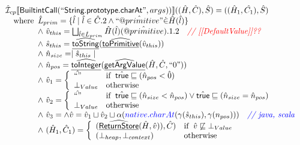 \documentclass{article}
\makeatletter
\newcommand{\SF}[1]{\mbox{\textsf{#1}}}
\newcommand{\comment}[1]{\textit{#1}}
\newcommand{\wherec}[1]{{\rm where}\begin{array}[t]{l}#1\end{array}}
\newcommand{\ifc}[1]{{\rm if}\begin{array}[t]{l}#1\end{array}}
\newcommand{\owc}{{\rm otherwise}}
\newcommand{\aI}{\hat{\mathcal{I}}}
\newcommand{\lbr}{\llbracket}
\newcommand{\rbr}{\rrbracket}
\newcommand{\ahf}[1]{\widehat{\underline{\sf #1}}}
\newcommand{\avarprop}[1]{\hat{@#1}}
\newcommand{\atrue}{\hat{\SF{true}}}
\def\inred{\color{red}}
\def\inblue{\color{blue}}
\def\inred{\color{red}}
\def\inblue{\color{blue}}
\makeatother
\begin{document}
\[\begin{array}{l}
\aI _{cp}\lbr \SF{BuiltintCall}(``\SF{String.prototype.charAt}",args))\rbr((\hat{H},\hat{C}), \hat{S})
  = ((\hat{H}_1, \hat{C_1}), \hat{S})\\
\quad\wherec{     
  \hat{L}_{prim} = \{ \hat{l} \mid \hat{l} \in \hat{C}.2 \land ``\avarprop{primitive}" \dot{\in}\hat{H}(\hat{l}) \}\\
  \land\ \hat{v}_{this} = \bigsqcup_{\hat{l} \in \hat{L}_{prim}} \hat{H}(\hat{l})(\avarprop{primitive}).1.2
    \quad\comment{{\inred // [[DefaultValue]]??}}\\
  \land\ \hat{s}_{this} = \ahf{toString}(\ahf{toPrimitive}(\hat{v}_{this}))\\
  \land\ \hat{n}_{size} = \mid \hat{s}_{this} \mid\\
  \land\ \hat{n}_{pos} = \ahf{toInteger}(\ahf{getArgValue}(\hat{H}, \hat{C}, ``0"))\\
  \land\ \hat{v}_1 =  \left\{\begin{array}{ll}
      \hat{``"} & \ifc{\atrue \sqsubseteq (\hat{n}_{pos} < \hat{0})}\\
      \bot_{Value} & \owc\\
    \end{array}\right.\\
  \land\ \hat{v}_2 =  \left\{\begin{array}{ll}
      \hat{``"}
      & \ifc{\atrue \sqsubseteq (\hat{n}_{size} < \hat{n}_{pos}) 
        \lor \atrue \sqsubseteq (\hat{n}_{size} = \hat{n}_{pos}) }\\
      \bot_{Value} & \owc\\
    \end{array}\right.\\
  \land\ \hat{v}_3 = 
  \land \hat{v} = \hat{v}_1 \sqcup \hat{v}_2 \sqcup \alpha({\inblue native.charAt}(\gamma(\hat{s}_{this}),\gamma(n_{pos})))\quad\comment{{\inblue // java, scala}}\\  
  \land\ (\hat{H}_1, \hat{C}_1) = 
    \left\{\begin{array}{ll}
      (\ahf{ReturnStore}(\hat{H}, \hat{v})), \hat{C})
      & \ifc{\hat{v} \not\sqsubseteq \bot_{Value}}\\
      (\bot_{heap}, \bot_{context}) & \owc \\
    \end{array}\right.\\
  }\\
\\\\



\end{array}\]
\end{document}
